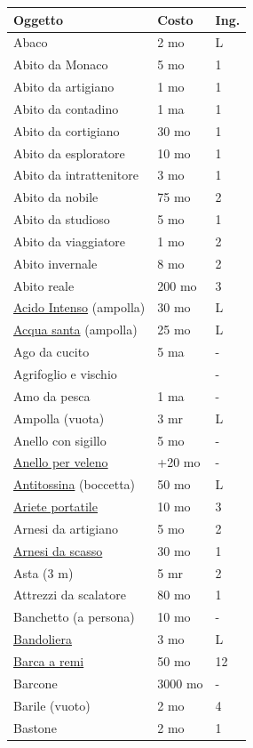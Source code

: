 \begin{multicols}{2}
\noindent\begin{tabularx}{\linewidth}{Xll}
	\toprule
\textbf{Oggetto}& \textbf{Costo} & \textbf{Ing.}\\
\toprule
Abaco&2 mo&L\\
Abito da Monaco & 5 mo& 1\\
Abito da artigiano& 1 mo& 1\\
Abito da contadino& 1 ma& 1\\
Abito da cortigiano& 30 mo& 1\\
Abito da esploratore& 10 mo& 1\\
Abito da intrattenitore & 3 mo& 1\\
Abito da nobile & 75 mo& 2\\
Abito da studioso & 5 mo& 1\\
Abito da viaggiatore& 1 mo& 2\\
Abito invernale & 8 mo& 2\\
Abito reale & 200 mo & 3\\
\hyperlink{Acido Intenso}{Acido Intenso} (ampolla) & 30 mo& L \\
\hyperlink{Acqua santa}{Acqua santa} (ampolla) & 25 mo& L\\
Ago da cucito & 5 ma &- \\
Agrifoglio e vischio & & -\\
Amo da pesca & 1 ma & - \\
Ampolla (vuota) & 3 mr & L \\
Anello con sigillo& 5 mo& - \\
\hyperlink{Anello per veleno}{Anello per veleno} & +20 mo&-\\
\hyperlink{Antitossina}{Antitossina} (boccetta)& 50 mo& L\\
\hyperlink{Ariete portatile}{Ariete portatile}& 10 mo& 3 \\
Arnesi da artigiano& 5 mo& 2\\
\hyperlink{Attrezzi da scasso}{Arnesi da scasso}& 30 mo& 1\\
Asta (3 m)& 5 mr& 2\\
Attrezzi da scalatore & 80 mo& 1\\
Banchetto (a persona) & 10 mo& -\\
\hyperlink{Bandoliera}{Bandoliera} & 3 mo & L\\
\hyperlink{Barca a remi}{Barca a remi}& 50 mo& 12\\
Barcone & 3000 mo& -\\
Barile (vuoto)& 2 mo& 4\\
Bastone & 2 mo& 1\\

\end{tabularx}
\end{multicols}

